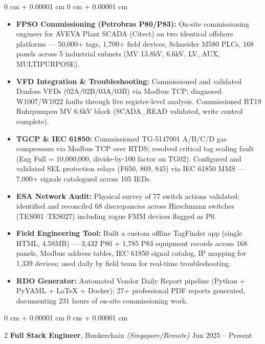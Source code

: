 \documentclass[10pt, letterpaper]{article}
\newenvironment{highlights}{ \begin{itemize}[ topsep=0.10 cm, parsep=0.10 cm, partopsep=0pt,
itemsep=0pt, leftmargin=0 cm + 10pt ] }{ \end{itemize} } %
\newenvironment{onecolentry}{ \begin{adjustwidth}{ 0 cm + 0.00001 cm }{ 0 cm + 0.00001 cm }
}{ \end{adjustwidth} } %
\newenvironment{twocolentry}[2][]{ \onecolentry \def\secondColumn{#2} \setcolumnwidth{\fill, 4.5 cm}
\begin{paracol}{2} }{ \switchcolumn \raggedleft \secondColumn \end{paracol}
\endonecolentry } %
\begin{document}
	\vspace{0.10 cm}
	\begin{onecolentry}
		\begin{highlights}
			\item \textbf{FPSO Commissioning (Petrobras P80/P83):} On-site commissioning engineer for AVEVA Plant SCADA (Citect) on two identical offshore platforms --- 50,000+ tags, 1,700+ field devices, Schneider M580 PLCs, 168 panels across 5 industrial subnets (MV 13.8kV, 6.6kV, LV, AUX, MULTIPURPOSE).
            \item \textbf{VFD Integration \& Troubleshooting:} Commissioned and validated Danfoss VFDs (02A/02B/03A/03B) via Modbus TCP; diagnosed W1007/W1022 faults through live register-level analysis. Commissioned BT19 Ruhrpumpen MV 6.6kV block (SCADA\_READ validated, write control complete).
            \item \textbf{TGCP \& IEC 61850:} Commissioned TG-5147001 A/B/C/D gas compressors via Modbus TCP over RTDS; resolved critical tag scaling fault (Eng Full = 10,000,000, divide-by-100 factor on TG02). Configured and validated SEL protection relays (F650, 869, 845) via IEC 61850 MMS --- 7,000+ signals catalogued across 105 IEDs.
			\item \textbf{ESA Network Audit:} Physical survey of 77 switch actions validated; identified and reconciled 68 discrepancies across Hirschmann switches (TES001--TES027) including rogue FMM devices flagged as P0.
            \item \textbf{Field Engineering Tool:} Built a custom offline TagFinder app (single HTML, 4.58MB) --- 3,432 P80 + 1,785 P83 equipment records across 168 panels, Modbus address tables, IEC 61850 signal catalog, IP mapping for 1,339 devices; used daily by field team for real-time troubleshooting.
            \item \textbf{RDO Generator:} Automated Vendor Daily Report pipeline (Python + PyYAML + LaTeX + Docker); 27+ professional PDF reports generated, documenting 231 hours of on-site commissioning work.
		\end{highlights}
	\end{onecolentry}

    \vspace{0.2 cm}

    \begin{twocolentry}
		{ Jun 2025 -- Present } \textbf{Full Stack Engineer}, Bunkerchain \textit{(Singapore/Remote)}
	\end{twocolentry}
\end{document}
